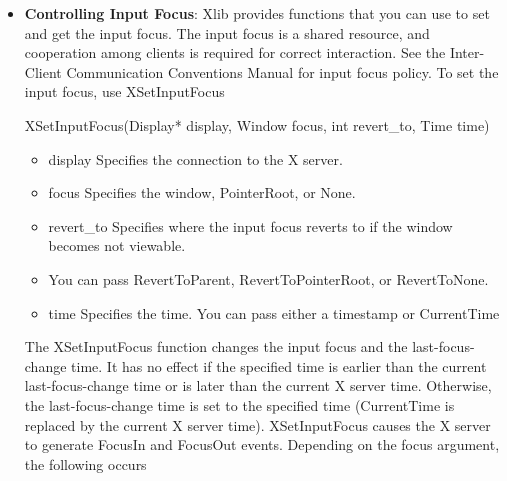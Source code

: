\documentclass{report}
\begin{document}
\begin{itemize}
            \bigbreak \noindent 
            There is seldom any reason for calling this function. The pointer should normally be left to the user. If you do use this function, however, it generates events just as if the user had instantaneously moved the pointer from one position to another. Note that you cannot use XWarpPointer to move the pointer outside the confine\_to window of an active pointer grab. An attempt to do so will only move the pointer as far as the closest edge of the confine\_to window.
            \bigbreak \noindent 
            XWarpPointer can generate a BadWindow error.
        \item \textbf{Controlling Input Focus}:  Xlib provides functions that you can use to set and get the input focus. The input focus is a shared resource, and cooperation among clients is required for correct interaction. See the Inter-Client Communication Conventions Manual for input focus policy.
            \bigbreak \noindent 
            To set the input focus, use XSetInputFocus
            \bigbreak \noindent 
            \begin{cppcode}
            XSetInputFocus(Display* display, Window focus, int revert_to, Time time)
            \end{cppcode}
            \begin{itemize}
                \item display Specifies the connection to the X server.
                \item focus Specifies the window, PointerRoot, or None.
                \item revert\_to Specifies where the input focus reverts to if the window becomes not viewable.
                \item You can pass RevertToParent, RevertToPointerRoot, or RevertToNone.
                \item time Specifies the time. You can pass either a timestamp or CurrentTime
            \end{itemize}
            The XSetInputFocus function changes the input focus and the last-focus-change time. It has no effect if the specified time is earlier than the current last-focus-change time or is later than the current X server time. Otherwise, the last-focus-change time is set to the specified time (CurrentTime is replaced by the current X server time). XSetInputFocus causes the X server to generate FocusIn and FocusOut events.
            \bigbreak \noindent 
            Depending on the focus argument, the following occurs
            \begin{itemize}

\end{itemize}
\end{itemize}
\end{document}
